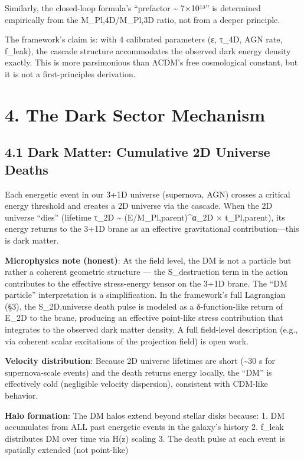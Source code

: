 \documentclass[11pt,a4paper]{article}
\begin{document}
Similarly, the closed-loop formula's ``prefactor \textasciitilde{}
7×10¹³'' is determined empirically from the M\_Pl,4D/M\_Pl,3D ratio, not
from a deeper principle.

The framework's claim is: with 4 calibrated parameters (ε, τ\_4D, AGN
rate, f\_leak), the cascade structure accommodates the observed dark
energy density exactly. This is more parsimonious than ΛCDM's free
cosmological constant, but it is not a first-principles derivation.

\hypertarget{the-dark-sector-mechanism}{%
\section{4. The Dark Sector Mechanism}\label{the-dark-sector-mechanism}}

\hypertarget{dark-matter-cumulative-2d-universe-deaths}{%
\subsection{4.1 Dark Matter: Cumulative 2D Universe
Deaths}\label{dark-matter-cumulative-2d-universe-deaths}}

Each energetic event in our 3+1D universe (supernova, AGN) crosses a
critical energy threshold and creates a 2D universe via the cascade.
When the 2D universe ``dies'' (lifetime τ\_2D \textasciitilde{}
(E/M\_Pl,parent)\^{}α\_2D × t\_Pl,parent), its energy returns to the
3+1D brane as an effective gravitational contribution---this is dark
matter.

\textbf{Microphysics note (honest)}: At the field level, the DM is not a
particle but rather a coherent geometric structure --- the
S\_destruction term in the action contributes to the effective
stress-energy tensor on the 3+1D brane. The ``DM particle''
interpretation is a simplification. In the framework's full Lagrangian
(§3), the S\_2D,universe death pulse is modeled as a δ-function-like
return of E\_2D to the brane, producing an effective point-like stress
contribution that integrates to the observed dark matter density. A full
field-level description (e.g., via coherent scalar excitations of the
projection field) is open work.

\textbf{Velocity distribution}: Because 2D universe lifetimes are short
(\textasciitilde30 s for supernova-scale events) and the death returns
energy locally, the ``DM'' is effectively cold (negligible velocity
dispersion), consistent with CDM-like behavior.

\textbf{Halo formation}: The DM halos extend beyond stellar disks
because: 1. DM accumulates from ALL past energetic events in the
galaxy's history 2. f\_leak distributes DM over time via H(z) scaling 3.
The death pulse at each event is spatially extended (not point-like)
\end{document}
